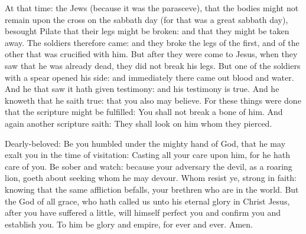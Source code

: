 \begin{multicols}{2}

At that time: the Jews (because it was the parasceve), that the bodies
might not remain upon the cross on the sabbath day (for that was a great
sabbath day), besought Pilate that their legs might be broken: and that
they might be taken away.
The soldiers therefore came: and they broke the legs of the
first, and of the other that was crucified with him.
But after they were come to Jesus, when they saw that he was
already dead, they did not break his legs.
But one of the soldiers with a spear opened his side: and
immediately there came out blood and water.
And he that saw it hath given testimony: and his testimony is
true. And he knoweth that he saith true: that you also may believe.
For these things were done that the scripture might be fulfilled:
You shall not break a bone of him.
And again another scripture saith: They shall look on him whom
they pierced.


\bigskip





Dearly-beloved: Be you humbled under the mighty hand of God, that he may exalt you in
the time of visitation: Casting all your care upon him, for he hath care of
you.  Be sober and watch: because your adversary the devil, as a roaring lion,
goeth about seeking whom he may devour.  Whom resist ye, strong in faith:
knowing that the same affliction befalls, your brethren who are in the world.
But the God of all grace, who hath called us unto his eternal glory in Christ
Jesus, after you have suffered a little, will himself perfect you and confirm
you and establish you.  To him be glory and empire, for ever and ever. Amen.




\end{multicols}
